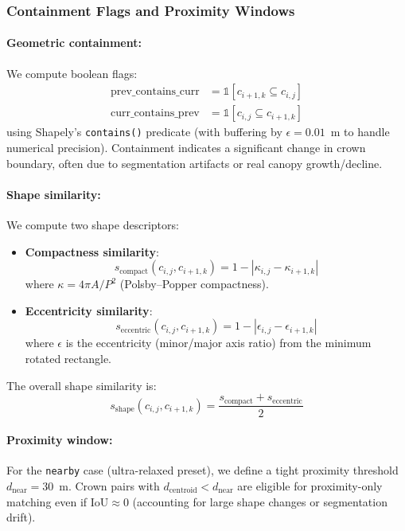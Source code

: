 \subsubsection{Containment Flags and Proximity Windows}

\paragraph{Geometric containment:} We compute boolean flags:
\begin{align*}
\text{prev\_contains\_curr} &= \mathbb{1}[c_{i+1,k} \subseteq c_{i,j}] \\
\text{curr\_contains\_prev} &= \mathbb{1}[c_{i,j} \subseteq c_{i+1,k}]
\end{align*}
using Shapely's \texttt{contains()} predicate (with buffering by $\epsilon = 0.01$~m to handle numerical precision). Containment indicates a significant change in crown boundary, often due to segmentation artifacts or real canopy growth/decline.

\paragraph{Shape similarity:} We compute two shape descriptors:
\begin{itemize}
    \item \textbf{Compactness similarity}: 
    \[
    s_{\text{compact}}(c_{i,j}, c_{i+1,k}) = 1 - |\kappa_{i,j} - \kappa_{i+1,k}|
    \]
    where $\kappa = 4\pi A / P^2$ (Polsby--Popper compactness).
    
    \item \textbf{Eccentricity similarity}:
    \[
    s_{\text{eccentric}}(c_{i,j}, c_{i+1,k}) = 1 - |\epsilon_{i,j} - \epsilon_{i+1,k}|
    \]
    where $\epsilon$ is the eccentricity (minor/major axis ratio) from the minimum rotated rectangle.
\end{itemize}
The overall shape similarity is:
\[
s_{\text{shape}}(c_{i,j}, c_{i+1,k}) = \frac{s_{\text{compact}} + s_{\text{eccentric}}}{2}
\]

\paragraph{Proximity window:} For the \texttt{nearby} case (ultra-relaxed preset), we define a tight proximity threshold $d_{\text{near}} = 30$~m. Crown pairs with $d_{\text{centroid}} < d_{\text{near}}$ are eligible for proximity-only matching even if $\text{IoU} \approx 0$ (accounting for large shape changes or segmentation drift).

